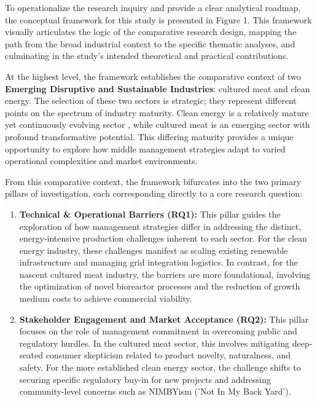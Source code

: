 To operationalize the research inquiry and provide a clear analytical roadmap, the conceptual framework for this study is presented in Figure 1. This framework visually articulates the logic of the comparative research design, mapping the path from the broad industrial context to the specific thematic analyses, and culminating in the study's intended theoretical and practical contributions.

At the highest level, the framework establishes the comparative context of two \textbf{Emerging Disruptive and Sustainable Industries}: cultured meat and clean energy. The selection of these two sectors is strategic; they represent different points on the spectrum of industry maturity. Clean energy is a relatively mature yet continuously evolving sector , while cultured meat is an emerging sector with profound transformative potential. This differing maturity provides a unique opportunity to explore how middle management strategies adapt to varied operational complexities and market environments.

From this comparative context, the framework bifurcates into the two primary pillars of investigation, each corresponding directly to a core research question:

\begin{enumerate}
	\item \textbf{Technical \& Operational Barriers (RQ1):} This pillar guides the exploration of how management strategies differ in addressing the distinct, energy-intensive production challenges inherent to each sector. For the clean energy industry, these challenges manifest as scaling existing renewable infrastructure and managing grid integration logistics. In contrast, for the nascent cultured meat industry, the barriers are more foundational, involving the optimization of novel bioreactor processes and the reduction of growth medium costs to achieve commercial viability.
	
	\item \textbf{Stakeholder Engagement and Market Acceptance (RQ2):} This pillar focuses on the role of management commitment in overcoming public and regulatory hurdles. In the cultured meat sector, this involves mitigating deep-seated consumer skepticism related to product novelty, naturalness, and safety. For the more established clean energy sector, the challenge shifts to securing specific regulatory buy-in for new projects and addressing community-level concerns such as NIMBYism ('Not In My Back Yard').
\end{enumerate}

